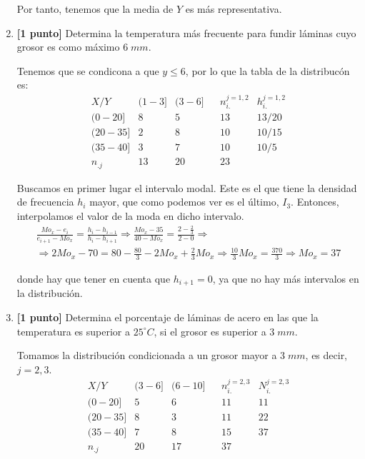 \documentclass[12pt]{article}
\begin{document}
\begin{ejercicio}
\begin{enumerate}
        Por tanto, tenemos que la media de $Y$ es más representativa.
        

        \item \textbf{[1 punto]} Determina la temperatura más frecuente para fundir láminas cuyo grosor es como máximo $6\;mm$.

        Tenemos que se condicona a que $y\leq 6$, por lo que la tabla de la distribucón es:
        \begin{equation*}
            \begin{array}{|c|c|c|c||c|c|c}
                 \hline X/Y & (1-3] & (3-6] && n_{i.}^{j=1,2} & h_{i.}^{j=1,2} \\ \hline
                 (0-20] & 8 & 5 && 13 & {13}/{20} \\
                 (20-35] & 2 & 8 && 10 & {10}/{15} \\
                 (35-40] & 3 & 7 && 10 & {10}/{5}\\ \hline \hline
                 n_{.j} & 13 & 20 && 23
            \end{array}
        \end{equation*}

        Buscamos en primer lugar el intervalo modal. Este es el que tiene la densidad de frecuencia $h_i$ mayor, que como podemos ver es el último, $I_3$. Entonces, interpolamos el valor de la moda en dicho intervalo.
        \begin{multline*}
            \frac{Mo_x-e_i}{e_{i+1}-Mo_x} = \frac{h_i - h_{i-1}}{h_i-h_{i+1}}
            \Longrightarrow
            \frac{Mo_x-35}{40-Mo_x} = \frac{2 - \frac{2}{3}}{2-0}
            \Longrightarrow \\ \Longrightarrow
            2Mo_x -70 = 80-\frac{80}{3} -2Mo_x + \frac{2}{3}Mo_x
            \Longrightarrow
            \frac{10}{3}Mo_x =\frac{370}{3} \Longrightarrow Mo_x= 37
        \end{multline*}

        donde hay que tener en cuenta que $h_{i+1}=0$, ya que no hay más intervalos en la distribución.

        \item \textbf{[1 punto]} Determina el porcentaje de láminas de acero en las que la temperatura es superior a $25^\circ C$, si el grosor es superior a $3\;mm$.

        Tomamos la distribución condicionada a un grosor mayor a $3\;mm$, es decir, $j=2,3$.
        \begin{equation*}
            \begin{array}{|c|c|c||c|c|c}
                 \hline X/Y & (3-6] & (6-10] && n_{i.}^{j=2,3} & N_{i.}^{j=2,3} \\ \hline
                 (0-20] & 5 & 6 && 11 & 11 \\
                 (20-35]  & 8 & 3 && 11 & 22 \\
                 (35-40]  & 7 & 8 && 15 & 37\\ \hline \hline
                 n_{.j}  & 20 & 17 && 37
            \end{array}
        \end{equation*}


\end{enumerate}
\end{ejercicio}
\end{document}
